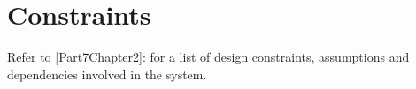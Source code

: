 
\chapter{Constraints} %

\label{Part2Chapter6} %


Refer to \ref{Part7Chapter2}: for a list of design constraints, assumptions and dependencies involved in the system.

